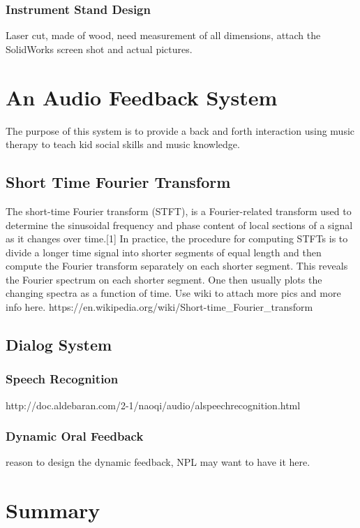 \subsubsection{Instrument Stand Design}
Laser cut, made of wood, need measurement of all dimensions, attach the SolidWorks
screen shot and actual pictures.

\section{An Audio Feedback System}
The purpose of this system is to provide a back and forth interaction using music therapy to teach kid social skills and music knowledge.

\subsection{Short Time Fourier Transform}
The short-time Fourier transform (STFT), is a Fourier-related transform used to determine the sinusoidal frequency and phase content of local sections of a signal as it changes over time.[1] In practice, the procedure for computing STFTs is to divide a longer time signal into shorter segments of equal length and then compute the Fourier transform separately on each shorter segment. This reveals the Fourier spectrum on each shorter segment. One then usually plots the changing spectra as a function of time.
Use wiki to attach more pics and more info here.
https://en.wikipedia.org/wiki/Short-time_Fourier_transform

\subsection{Dialog System}

\subsubsection{Speech Recognition}
http://doc.aldebaran.com/2-1/naoqi/audio/alspeechrecognition.html

\subsubsection{Dynamic Oral Feedback}
reason to design the dynamic feedback, NPL may want to have it here. 



\section{Summary}

